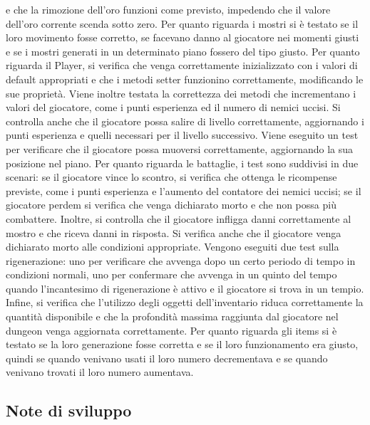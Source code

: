 \documentclass{report}
\begin{document}
%
e che la rimozione dell’oro funzioni come previsto, impedendo che il valore dell’oro corrente scenda sotto zero. \newline
%
Per quanto riguarda i mostri si è testato se il loro movimento fosse corretto, se facevano danno al giocatore nei momenti giusti e se i mostri generati in un determinato piano fossero del tipo giusto. \newline
%
Per quanto riguarda il Player, si verifica che venga correttamente inizializzato con i valori di default appropriati e che i metodi setter funzionino correttamente, modificando le sue proprietà.
%
Viene inoltre testata la correttezza dei metodi che incrementano i valori del giocatore, come i punti esperienza ed il numero di nemici uccisi. Si controlla anche che il giocatore possa salire di livello correttamente, 
%
aggiornando i punti esperienza e quelli necessari per il livello successivo. Viene eseguito un test per verificare che il giocatore possa muoversi correttamente, aggiornando la sua posizione nel piano. \newline
%
Per quanto riguarda le battaglie, i test sono suddivisi in due scenari: se il giocatore vince lo scontro, si verifica che ottenga le ricompense previste, come i punti esperienza e l’aumento del contatore dei nemici uccisi;
%
se il giocatore perdem si verifica che venga dichiarato morto e che non possa più combattere. Inoltre, si controlla che il giocatore infligga danni correttamente al mostro e che riceva danni in risposta. Si verifica anche 
%
che il giocatore venga dichiarato morto alle condizioni appropriate. \newline
%
Vengono eseguiti due test sulla rigenerazione: uno per verificare che avvenga dopo un certo periodo di tempo in condizioni normali, uno per confermare che avvenga in un quinto del tempo quando l’incantesimo di rigenerazione 
%
è attivo e il giocatore si trova in un tempio. \newline
%
Infine, si verifica che l’utilizzo degli oggetti dell’inventario riduca correttamente la quantità disponibile e che la profondità massima raggiunta dal giocatore nel dungeon venga aggiornata correttamente. \newline
%
Per quanto riguarda gli items si è testato se la loro generazione fosse corretta e se il loro funzionamento era giusto, quindi se quando venivano usati il loro numero decrementava e se quando venivano trovati il loro numero aumentava. \newline
%

\subsection{Note di sviluppo}
\end{document}
